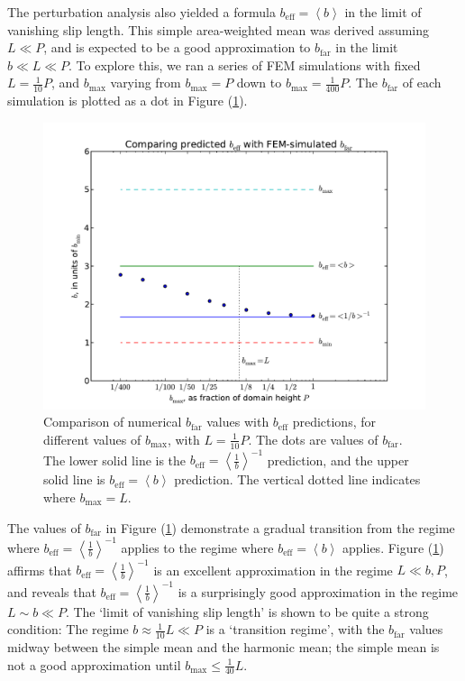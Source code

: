 \documentclass[12pt, a4paper, twoside, openright]{book}
\newcommand{\beff}{\ensuremath{b_{\mathrm{eff}}}}
\newcommand{\bmax}{\ensuremath{b_{\mathrm{max}}}}
\newcommand{\bfar}{\ensuremath{b_{\mathrm{far}}}}
\newcommand{\beffh}{\ensuremath{b_{\mathrm{eff}}} = \left< \frac{1}{b} \right>^{-1} }
\newcommand{\beffm}{\ensuremath{b_{\mathrm{eff}}} = \left< b \right> }
\begin{document}
The perturbation analysis also yielded a formula $\beffm$ in the limit of vanishing slip length.  This simple area-weighted mean was derived assuming $L \ll P$, and is expected to be a good approximation to $\bfar$ in the limit $b \ll L \ll P$.  To explore this, we ran a series of FEM simulations with fixed $L = \frac{1}{10}P$, and $\bmax$ varying from $\bmax = P$ down to $\bmax = \frac{1}{400}P$.  The $\bfar$ of each simulation is plotted as a dot in Figure (\ref{FEMplotflatb}).

\begin{figure}[ht]
\includegraphics[scale=0.595]{Lund_Thesis_FEM_plot_flat_b}
\caption{Comparison of numerical $\bfar$ values with $\beff$ predictions, for different values of $\bmax$, with $L = \frac{1}{10}P$. The dots are values of $\bfar$. The lower solid line is the $\beffh$ prediction, and the upper solid line is $\beffm$ prediction.  The vertical dotted line indicates where $\bmax = L$.}\label{FEMplotflatb}
\end{figure}

The values of $\bfar$ in Figure (\ref{FEMplotflatb}) demonstrate a gradual transition from the regime where $\beffh$ applies to the regime where $\beffm$ applies.
Figure (\ref{FEMplotflatb}) affirms that $\beffh$ is an excellent approximation in the regime $L \ll b,P$, and reveals that $\beffh$ is a surprisingly good approximation in the regime $ L \sim b \ll P$.
 The `limit of vanishing slip length' is shown to be quite a strong condition: The regime $b \approx \frac{1}{1	0} L \ll P$ is a `transition regime', with the $\bfar$ values midway between the simple mean and the harmonic mean; the simple mean is not a good approximation until $\bmax \leq \frac{1}{40}L$.
\end{document}
